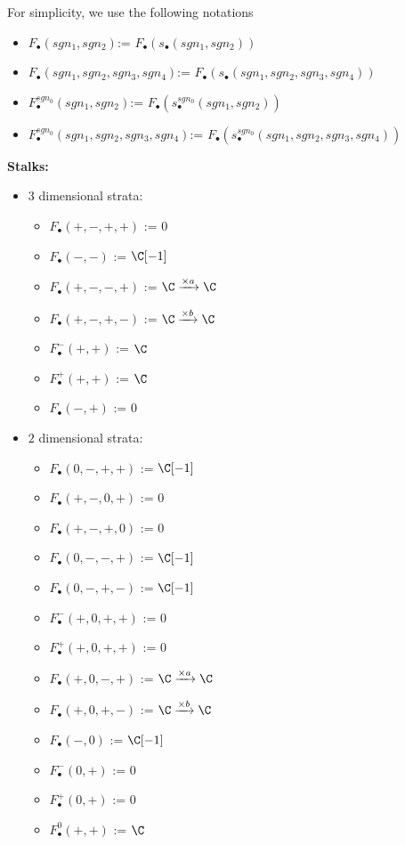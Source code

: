 For simplicity, we use the following notations
\begin{itemize}
\item $F_\bullet(sgn_1,sgn_2)$:= $F_\bullet(s_\bullet(sgn_1,sgn_2))$
\item $F_\bullet(sgn_1,sgn_2,sgn_3,sgn_4)$:= $F_\bullet(s_\bullet(sgn_1,sgn_2,sgn_3,sgn_4))$
\item $F^{sgn_0}_\bullet(sgn_1,sgn_2)$:= $F_\bullet(s^{sgn_0}_\bullet(sgn_1,sgn_2))$
\item $F^{sgn_0}_\bullet(sgn_1,sgn_2,sgn_3,sgn_4)$:= $F_\bullet(s^{sgn_0}_\bullet(sgn_1,sgn_2,sgn_3,sgn_4))$
\end{itemize}
\textbf{Stalks:}
\begin{itemize}
\item $3$ dimensional strata:
\begin{itemize}
\item $F_\bullet(+,-,+,+)$ := $0$
\item $F_\bullet(-,-)$ := $\C[-1]$
\item $F_\bullet(+,-,-,+)$ := $\C \xrightarrow{\times a} \C $
\item $F_\bullet(+,-,+,-)$ := $\C \xrightarrow{\times b} \C $
\item $F_\bullet^-(+,+)$ := $\C$
\item $F_\bullet^+(+,+)$ := $\C$
\item $F_\bullet(-,+)$ := $0$
\end{itemize}

\item $2$ dimensional strata:
\begin{itemize}
\item $F_\bullet(0,-,+,+)$ := $\C[-1]$
\item $F_\bullet(+,-,0,+)$ := $0$
\item $F_\bullet(+,-,+,0)$ := $0$
\item $F_\bullet(0,-,-,+)$ := $\C[-1]$
\item $F_\bullet(0,-,+,-)$ := $\C[-1]$
\item $F_\bullet^-(+,0,+,+)$ := $0$
\item $F_\bullet^+(+,0,+,+)$ := $0$
\item $F_\bullet(+,0,-,+)$ := $\C \xrightarrow{\times a} \C $
\item $F_\bullet(+,0,+,-)$ := $\C \xrightarrow{\times b} \C $
\item $F_\bullet(-,0)$ := $\C[-1]$
\item $F_\bullet^-(0,+)$ := $0$
\item $F_\bullet^+(0,+)$ := $0$
\item $F_\bullet^0(+,+)$ := $\C$
\end{itemize}


\end{itemize}
